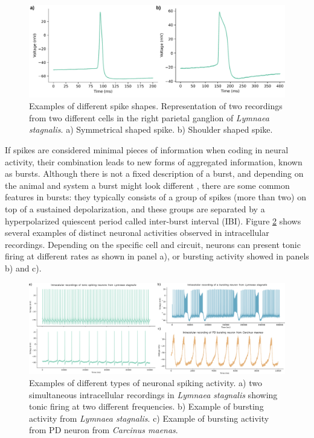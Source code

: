 \begin{figure}[htb!]
    \centering
    \includegraphics[width=\linewidth]{img/intro/spike-types.pdf}
    \caption{Examples of different spike shapes. Representation of two recordings from two different cells in the right parietal ganglion of \textit{Lymnaea stagnalis}. a) Symmetrical shaped spike. b) Shoulder shaped spike.}
    \label{fig:spike-types}
\end{figure}

If spikes are considered minimal pieces of information when coding in neural activity, their combination leads to new forms of aggregated information, known as bursts. Although there is not a fixed description of a burst, and depending on the animal and system a burst might look different \parencite{russell_bursting_1978,palmu_detection_2010,lundqvist_gamma_2016}, there are some common features in bursts: they typically consists of a group of spikes (more than two) on top of a sustained depolarization, and these groups are separated by a hyperpolarized quiescent period called inter-burst interval (IBI). Figure \ref{fig:spike_activity-types} shows several examples of distinct neuronal activities observed in intracellular recordings. Depending on the specific cell and circuit, neurons can present tonic firing at different rates as shown in panel a), or bursting activity showed in panels b) and c). 

\begin{figure}[htb!]
    \centering
    \includegraphics[width=\linewidth]{img/intro/spike_activity-types.png}
    \caption{Examples of different types of neuronal spiking activity. a) two simultaneous intracellular recordings in \textit{Lymnaea stagnalis} showing tonic firing at two different frequencies. b) Example of bursting activity from \textit{Lymnaea stagnalis}. c) Example of bursting activity from PD neuron from \textit{Carcinus maenas}.}
    \label{fig:spike_activity-types}
\end{figure}


